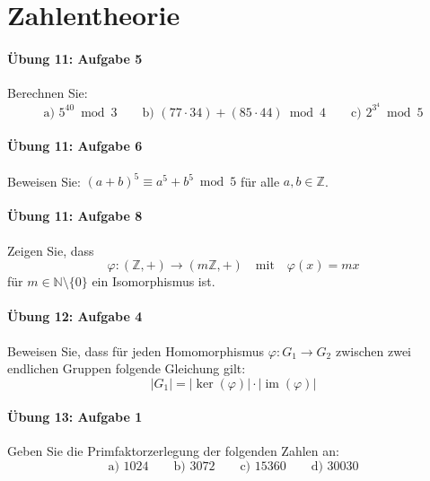 \documentclass
[
  draft    = true,
  fontsize = 11pt,
  parskip  = half-,
  BCOR     = 0pt,
  DIV      = 11,
  ngerman,
  dvipsnames
]
{scrartcl}
\begin{document}
\section{Zahlentheorie}

\paragraph{Übung 11: Aufgabe 5}
Berechnen Sie:
\begin{equation*}
  \text{a) }5^{40}\bmod3
  \qquad
  \text{b) }(77\cdot34)+(85\cdot44)\bmod4
  \qquad
  \text{c) }2^{3^4}\bmod5
\end{equation*}

\paragraph{Übung 11: Aufgabe 6}
Beweisen Sie: $(a+b)^5\equiv a^5+b^5\bmod5$ für alle $a,b\in\mathbb{Z}$.

\paragraph{Übung 11: Aufgabe 8}
Zeigen Sie, dass
\begin{equation*}
  \varphi:(\mathbb{Z},+)\rightarrow(m\mathbb{Z},+)\quad\text{mit}\quad\varphi(x)=mx
\end{equation*}
für $m\in\mathbb{N}\setminus\{0\}$ ein Isomorphismus ist.

\paragraph{Übung 12: Aufgabe 4}
Beweisen Sie, dass für jeden Homomorphismus $\varphi:G_1\rightarrow G_2$
zwischen zwei endlichen Gruppen folgende Gleichung gilt:
\begin{equation*}
  |G_1|=|\ker(\varphi)|\cdot|\operatorname{im}(\varphi)|
\end{equation*}

\paragraph{Übung 13: Aufgabe 1}
Geben Sie die Primfaktorzerlegung der folgenden Zahlen an:
\begin{equation*}
  \text{a) }1024
  \qquad
  \text{b) }3072
  \qquad
  \text{c) }15360
  \qquad
  \text{d) }30030
\end{equation*}
\end{document}
